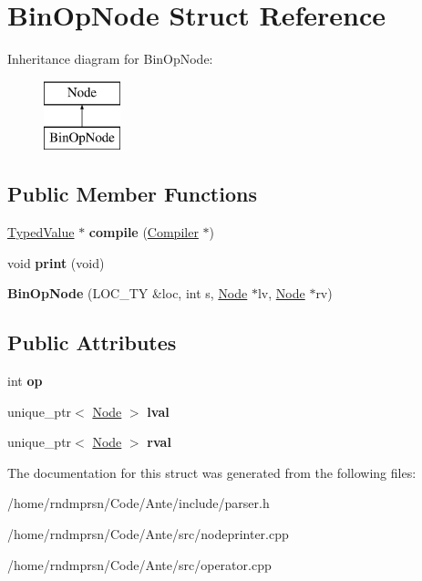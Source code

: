 \hypertarget{structBinOpNode}{}\section{Bin\+Op\+Node Struct Reference}
\label{structBinOpNode}
Inheritance diagram for Bin\+Op\+Node\+:\begin{figure}[H]
\begin{center}
\leavevmode
\includegraphics[height=2.000000cm]{structBinOpNode}
\end{center}
\end{figure}
\subsection*{Public Member Functions}
\begin{DoxyCompactItemize}
\item 
\mbox{\label{structBinOpNode_ae1f795e8a4a9a2c63b9fdb2ce35f3c39}} 
\hyperlink{structTypedValue}{Typed\+Value} $\ast$ {\bfseries compile} (\hyperlink{structante_1_1Compiler}{Compiler} $\ast$)
\item 
\mbox{\label{structBinOpNode_a7eceafc0cc1e52f7415920d967d04822}} 
void {\bfseries print} (void)
\item 
\mbox{\label{structBinOpNode_a00fd1da1a205cecae852af581dc54124}} 
{\bfseries Bin\+Op\+Node} (L\+O\+C\+\_\+\+TY \&loc, int s, \hyperlink{structNode}{Node} $\ast$lv, \hyperlink{structNode}{Node} $\ast$rv)
\end{DoxyCompactItemize}
\subsection*{Public Attributes}
\begin{DoxyCompactItemize}
\item 
\mbox{\label{structBinOpNode_a07ee61b9dc1b981e6f10f0ee129af220}} 
int {\bfseries op}
\item 
\mbox{\label{structBinOpNode_a050438d2b49d82b20c724a93a2a9f015}} 
unique\+\_\+ptr$<$ \hyperlink{structNode}{Node} $>$ {\bfseries lval}
\item 
\mbox{\label{structBinOpNode_ab001bb9895583627cebd5381890eec36}} 
unique\+\_\+ptr$<$ \hyperlink{structNode}{Node} $>$ {\bfseries rval}
\end{DoxyCompactItemize}


The documentation for this struct was generated from the following files\+:\begin{DoxyCompactItemize}
\item 
/home/rndmprsn/\+Code/\+Ante/include/parser.\+h\item 
/home/rndmprsn/\+Code/\+Ante/src/nodeprinter.\+cpp\item 
/home/rndmprsn/\+Code/\+Ante/src/operator.\+cpp\end{DoxyCompactItemize}
